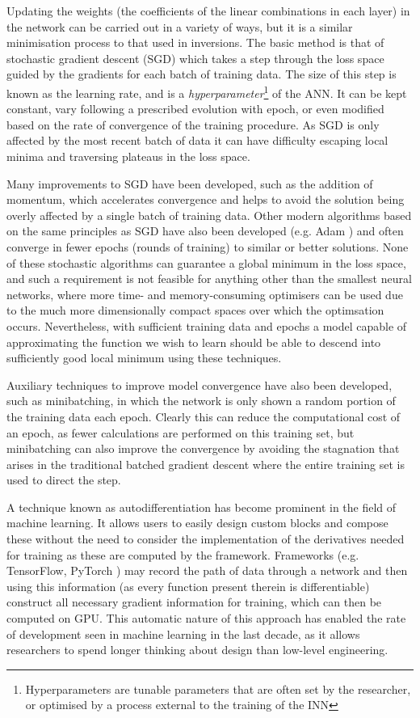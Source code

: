 Updating the weights (the coefficients of the linear combinations in each layer) in the network can be carried out in a variety of ways, but it is a similar minimisation process to that used in inversions.
The basic method is that of stochastic gradient descent (SGD) which takes a step through the loss space guided by the gradients for each batch of training data.
The size of this step is known as the learning rate, and is a \emph{hyperparameter}\footnote{Hyperparameters are tunable parameters that are often set by the researcher, or optimised by a process external to the training of the INN} of the ANN.
It can be kept constant, vary following a prescribed evolution with epoch, or even modified based on the rate of convergence of the training procedure.
As SGD is only affected by the most recent batch of data it can have difficulty escaping local minima and traversing plateaus in the loss space.

Many improvements to SGD have been developed, such as the addition of momentum, which accelerates convergence and helps to avoid the solution being overly affected by a single batch of training data.
Other modern algorithms based on the same principles as SGD have also been developed (e.g. Adam \citet{2014Kingma}) and often converge in fewer epochs (rounds of training) to similar or better solutions.
None of these stochastic algorithms can guarantee a global minimum in the loss space, and such a requirement is not feasible for anything other than the smallest neural networks, where more time- and memory-consuming optimisers can be used due to the much more dimensionally compact spaces over which the optimsation occurs.
Nevertheless, with sufficient training data and epochs a model capable of approximating the function we wish to learn should be able to descend into sufficiently good local minimum using these techniques.

Auxiliary techniques to improve model convergence have also been developed, such as minibatching, in which the network is only shown a random portion of the training data each epoch.
Clearly this can reduce the computational cost of an epoch, as fewer calculations are performed on this training set, but minibatching can also improve the convergence by avoiding the stagnation that arises in the traditional batched gradient descent where the entire training set is used to direct the step.

A technique known as autodifferentiation has become prominent in the field of machine learning.
It allows users to easily design custom blocks and compose these without the need to consider the implementation of the derivatives needed for training as these are computed by the framework.
Frameworks (e.g. TensorFlow, PyTorch \NeedRef{}) may record the path of data through a network and then using this information (as every function present therein is differentiable) construct all necessary gradient information for training, which can then be computed on GPU.
This automatic nature of this approach has enabled the rate of development seen in machine learning in the last decade, as it allows researchers to spend longer thinking about design than low-level engineering.

